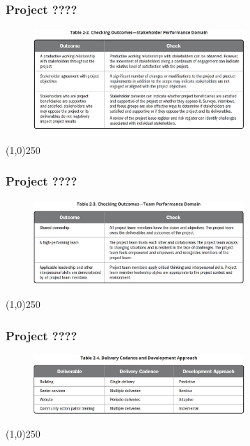 \begin{frame}
\frametitle{Project ????}
 \begin{figure}
    \centering
        \includegraphics[width = 8cm]{../images/guide/Table2-2.jpg}
    \label{guideTable:2-2}
 \end{figure}
\end{frame}
\begin{center}\line(1,0){250}\end{center}

\begin{frame}
\frametitle{Project ????}
 \begin{figure}
    \centering
        \includegraphics[width = 8cm]{../images/guide/Table2-3.jpg}
    \label{guideTable:2-3}
 \end{figure}
\end{frame}
\begin{center}\line(1,0){250}\end{center}

\begin{frame}
\frametitle{Project ????}
 \begin{figure}
    \centering
        \includegraphics[width = 8cm]{../images/guide/Table2-4.jpg}
    \label{guideTable:2-4}
 \end{figure}
\end{frame}
\begin{center}\line(1,0){250}\end{center}

